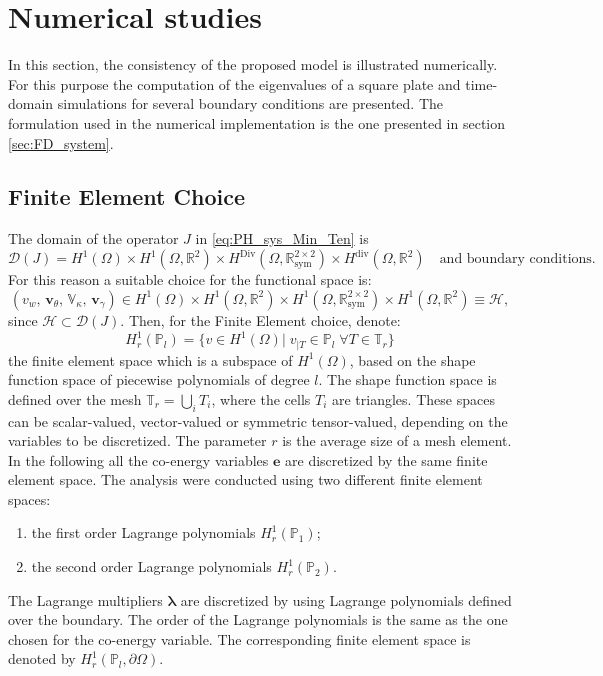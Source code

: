 \documentclass[preprint,12pt]{elsarticle}
\newcommand{\secondReviewer}[1]{\textcolor{blue!80!black}{#1}}
\begin{document}
{
\section{Numerical studies}
\label{sec:Num}
In this section, the consistency of the proposed model is illustrated numerically. For this purpose the computation of the eigenvalues of a square plate and time-domain simulations for several boundary conditions are presented. The formulation used in the numerical implementation is the one presented in section \ref{sec:FD_system}. 
\subsection{Finite Element Choice}
The domain of the operator $J$ in \eqref{eq:PH_sys_Min_Ten} is 
\begin{equation*}
\label{eq:domJ}
\mathcal{D}(J) = H^{1}(\Omega) \times H^{1}(\Omega, \mathbb{R}^2) \times H^{\text{Div}}(\Omega, \mathbb{R}^{2 \times 2}_{\text{sym}}) \times H^{\text{div}}(\Omega, \mathbb{R}^2) \quad \text{and boundary conditions}.
\end{equation*}
For this reason a suitable choice for the functional space is:
\begin{equation}
\label{eq:funcSpace}
	(v_w, \, \bm{v}_\theta, \, \mathbb{V}_\kappa, \, \bm{v}_{\gamma}) \in H^{1}(\Omega) \times H^{1}(\Omega, \mathbb{R}^2) \times H^{1}(\Omega, \mathbb{R}^{2 \times 2}_{\text{sym}}) \times H^{1}(\Omega, \mathbb{R}^2) \equiv \mathscr{H},
\end{equation}
since $\mathscr{H} \subset \mathcal{D}(J)$. Then, for the Finite Element choice, denote:
\[ H_r^1(\mathbb{P}_l) = \{ v \in H^1(\Omega)|\; v_{|T} \in \mathbb{P}_l \; \forall T \in \mathbb{T}_r \} 
\]
the finite element space which is a subspace of $H^1(\Omega)$, based on the shape function space of piecewise polynomials of degree $l$. The shape function space is defined over the mesh $\mathbb{T}_r = \bigcup_i T_i$, where the cells $T_i$ are triangles. These spaces can be scalar-valued, vector-valued or symmetric tensor-valued, depending on the variables to be discretized. The parameter $r$ is the average size of a mesh element. In the following all the co-energy variables $\bm{e}$  are discretized by the same finite element space. The analysis were conducted using two different finite element spaces:
\begin{enumerate}
	\item the first order Lagrange polynomials $H_r^1(\mathbb{P}_1)$;
	\item the second order Lagrange polynomials $H_r^1(\mathbb{P}_2)$.
\end{enumerate}
\secondReviewer{The Lagrange multipliers $\bm{\lambda}$ are discretized by using  Lagrange polynomials defined over the boundary. The order of the Lagrange polynomials is the same as the one chosen for the co-energy variable. The corresponding finite element space is denoted by $H_r^1(\mathbb{P}_l, \partial \Omega)$.}

}
\end{document}
